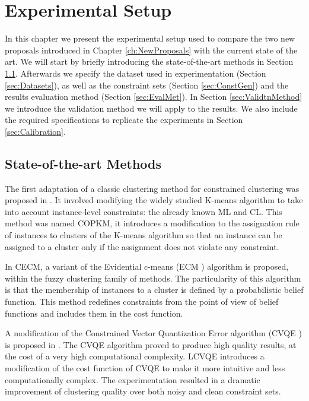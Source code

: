 \chapter{Experimental Setup} \label{ch:ExperimentalSetup}

In this chapter we present the experimental setup used to compare the two new proposals introduced in Chapter \ref{ch:NewProposals} with the current state of the art. We will start by briefly introducing the state-of-the-art methods in Section \ref{sec:SOTA}. Afterwards we specify the dataset used in experimentation (Section \ref{sec:Datasets}), as well as the constraint sets (Section \ref{sec:ConstGen}) and the results evaluation method (Section \ref{sec:EvalMet}). In Section \ref{sec:ValidtnMethod} we introduce the validation method we will apply to the results. We also include the required specifications to replicate the experiments in Section \ref{sec:Calibration}.

\section{State-of-the-art Methods} \label{sec:SOTA}

The first adaptation of a classic clustering method for constrained clustering was proposed in \cite{wagstaff2001constrained}. It involved modifying the widely studied K-means algorithm to take into account instance-level constraints: the already known ML and CL. This method was named \acf{COPKM}, it introduces a modification to the assignation rule of instances to clusters of the K-means algorithm so that an instance can be assigned to a cluster only if the assignment does not violate any constraint.

In \cite{antoine2012cecm} \acf{CECM}, a variant of the Evidential c-means (ECM \cite{masson2008ecm}) algorithm is proposed, within the fuzzy clustering family of methods. The particularity of this algorithm is that the membership of instances to a cluster is defined by a probabilistic belief function. This method redefines constraints from the point of view of belief functions and includes them in the cost function.

A modification of the Constrained Vector Quantization Error algorithm (CVQE \cite{davidson2005clustering}) is proposed in \cite{pelleg2007k}. The CVQE algorithm proved to produce high quality results, at the cost of a very high computational complexity. \acf{LCVQE} introduces a modification of the cost function of CVQE to make it more intuitive and less computationally complex. The experimentation resulted in a dramatic improvement of clustering quality over both noisy and clean constraint sets.

